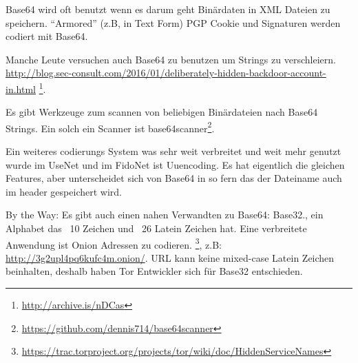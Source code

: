 Base64 wird oft benutzt wenn es darum geht Bin\"ardaten in  XML Dateien zu speichern.
``Armored'' (z.B, in Text Form) PGP Cookie und Signaturen werden codiert mit Base64.

Manche Leute versuchen auch Base64 zu benutzen um Strings zu verschleiern. 
\url{http://blog.sec-consult.com/2016/01/deliberately-hidden-backdoor-account-in.html}
\footnote{\url{http://archive.is/nDCas}}.

Es gibt Werkzeuge zum scannen von beliebigen Bin\"ardateien nach Base64 Strings.
Ein solch ein Scanner ist base64scanner\footnote{\url{https://github.com/dennis714/base64scanner}}.

Ein weiteres codierungs System was sehr weit verbreitet und weit mehr genutzt wurde im UseNet und im 
FidoNet ist Uuencoding. Es hat eigentlich die gleichen Features, aber unterscheidet sich von Base64 
in so fern das der Dateiname auch im header gespeichert wird.

By the Way: Es gibt auch einen nahen Verwandten zu Base64: Base32., ein Alphabet das ~10 Zeichen und ~26 Latein Zeichen hat. 
Eine verbreitete Anwendung ist Onion Adressen zu codieren. 
\footnote{\url{https://trac.torproject.org/projects/tor/wiki/doc/HiddenServiceNames}},
z.B: \url{http://3g2upl4pq6kufc4m.onion/}.
\ac{URL} kann keine mixed-case Latein Zeichen beinhalten, deshalb haben Tor Entwickler sich f\"ur Base32 entschieden.
